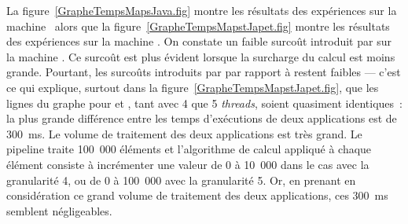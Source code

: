 
La figure~\ref{GrapheTempsMapsJava.fig} montre les r\'esultats des exp\'eriences sur la machine \ alors que la figure~\ref{GrapheTempsMapstJapet.fig} montre les r\'esultats des exp\'eriences sur la machine . On constate un faible surco\^ut
introduit par  sur la machine . Ce surco\^ut est plus \'evident lorsque la surcharge du calcul est moins grande. Pourtant, les surco\^uts introduits par  par rapport \`a  restent faibles --- c'est ce qui explique, surtout dans la figure~\ref{GrapheTempsMapstJapet.fig}, que les lignes du graphe pour  et , tant avec 4 que 5 \emph{threads}, soient quasiment identiques~: la plus grande diff\'erence entre les temps d'ex\'ecutions de deux applications est de 300~ms. Le volume de traitement des deux applications est tr\`es grand. Le pipeline traite 100~000 \'el\'ements et l'algorithme de calcul appliqu\'e \`a chaque \'el\'ement consiste \`a incr\'ementer une valeur de 0 \`a 10~000 dans le cas avec la granularit\'e 4, ou de 0 \`a 100~000 avec la granularit\'e 5. Or, en prenant en consid\'eration ce grand volume de traitement des deux applications, ces 300~ms semblent n\'egligeables.





